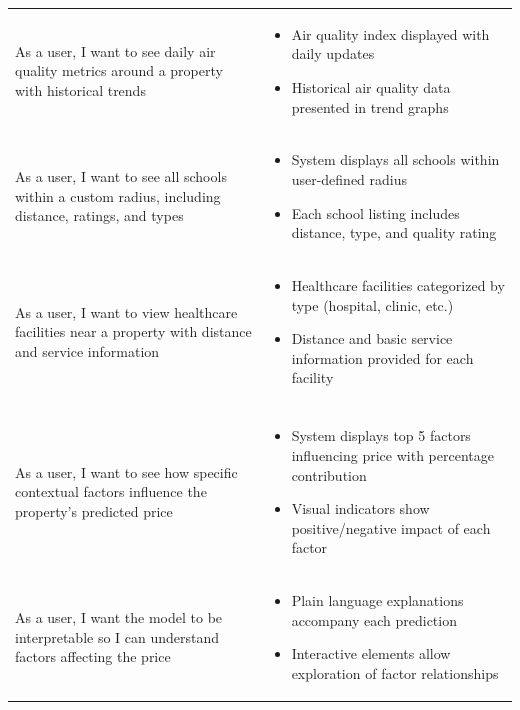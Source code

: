 \begin{longtable}{>{\raggedright\arraybackslash}p{}>{\raggedright\arraybackslash}p{}}
	As a user, I want to see daily air quality metrics around a property with historical trends &
	\begin{itemize}
	\item Air quality index displayed with daily updates
	\item Historical air quality data presented in trend graphs
	\end{itemize} \\
	  
	\rowcolor[gray]{0.95}
	As a user, I want to see all schools within a custom radius, including distance, ratings, and types &
	\begin{itemize}
	\item System displays all schools within user-defined radius
	\item Each school listing includes distance, type, and quality rating
	\end{itemize} \\
	  
	As a user, I want to view healthcare facilities near a property with distance and service information &
	\begin{itemize}
	\item Healthcare facilities categorized by type (hospital, clinic, etc.)
	\item Distance and basic service information provided for each facility
	\end{itemize} \\
	
	\midrule
	\multicolumn{2}{l}{\textbf{Explainable Price Prediction Model}} \\
	\midrule
	As a user, I want to see how specific contextual factors influence the property's predicted price &
	\begin{itemize}
	\item System displays top 5 factors influencing price with percentage contribution
	\item Visual indicators show positive/negative impact of each factor
	\end{itemize} \\
	  
	\rowcolor[gray]{0.95}
	As a user, I want the model to be interpretable so I can understand factors affecting the price &
	\begin{itemize}
	\item Plain language explanations accompany each prediction
	\item Interactive elements allow exploration of factor relationships
	\end{itemize} \\
	  

\end{longtable}
